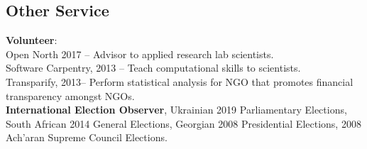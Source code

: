 \documentclass[margin,line]{res}
\begin{document}
{\begin{resume}
\section{\sc  Other Service}
\textbf{Volunteer}: \\
Open North 2017 -- Advisor to applied research lab
scientists.\\
Software Carpentry, 2013 -- 
Teach computational skills to
scientists.\\
Transparify, 2013--
 Perform statistical analysis for NGO that promotes
financial transparency amongst NGOs.  \\
\textbf{International Election Observer}, Ukrainian 2019 Parliamentary
Elections, South African 2014 General
Elections, Georgian 2008 Presidential Elections, 2008 Ach'aran Supreme
Council Elections. 


\end{resume}}
\end{document}
